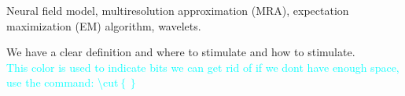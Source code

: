 \documentclass[journal,a4paper]{IEEEtran}
\newcommand{\cut}[1]{\textcolor{cyan}{#1}}
\begin{document}







\maketitle


\begin{abstract}
\end{abstract}

\begin{IEEEkeywords}
Neural field model, multiresolution approximation (MRA), expectation maximization (EM) algorithm, wavelets.
\end{IEEEkeywords}






%
\IEEEpeerreviewmaketitle

We have a clear definition and where to stimulate and how to stimulate.\\
\cut{This color is used to indicate bits we can get rid of if we dont have enough space, use the command: \textbackslash cut$\left\lbrace  \right\rbrace$}
\end{document}
